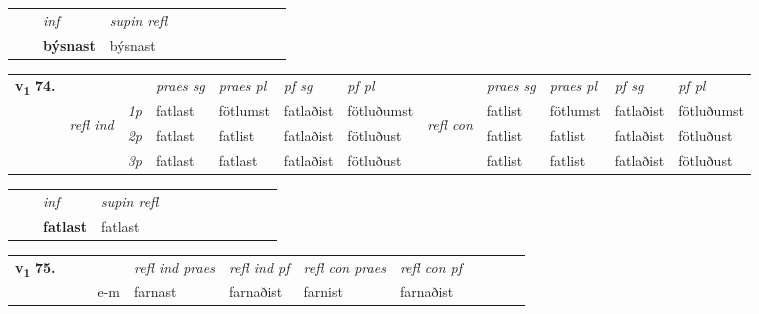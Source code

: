 \begin{tabular}{llllllllllll}
 & & \textit{inf}       & \textit{supin refl}      \\*
  & & \textbf{býsnast}        & býsnast  \\*
\cmidrule{1-12}
\end{tabular}



\begin{tabular}{llllllllllll} \toprule
\multirow{4}{*}{{{\textbf{v{\textsubscript{1}}} \Large{\textbf{74.}}}}}  & &   &  \textit{praes sg}  & \textit{praes pl}  &\textit{pf sg} & \textit{pf pl} &  &  \textit{praes sg}  & \textit{praes pl}  & \textit{pf sg} & \textit{pf pl } \\*
	\cmidrule{4-7} \cmidrule{9-12}
 &\multirow{3}{*}{\begin{turn}{90}\textit{refl ind}\end{turn}} & {\textit{1p}} & fatlast & fötlumst    & fatlaðist & fötluðumst & \multirow{3}{*}{\begin{turn}{90}\textit{refl con}\end{turn}}  &fatlist & fötlumst & fatlaðist & fötluðumst\\*
 &&  {\textit{2p}} &  fatlast  & fatlist   & fatlaðist & fötluðust & &fatlist & fatlist & fatlaðist & fötluðust \\*
& &  {\textit{3p}} & fatlast & fatlast   & fatlaðist & fötluðust & & fatlist & fatlist& fatlaðist & fötluðust  \\*
\cmidrule{4-7} \cmidrule{9-12}
\end{tabular}


\begin{tabular}{llllllllllll}
 & & \textit{inf}       & \textit{supin refl}      \\*
  & & \textbf{fatlast}        & fatlast  \\*
\cmidrule{1-12}
\end{tabular}





\begin{tabular}{llllllllllll}\toprule
\multirow{4}{*}{{{\textbf{v{\textsubscript{1}}} \Large{\textbf{75.}}}}}  & &  & &  \textit{refl ind praes} & \textit{refl ind pf} & \textit{refl con praes} & \textit{refl con pf} \\*
&  & & e-m & farnast & farnaðist & farnist & farnaðist \\*
\cmidrule{5-9}
\end{tabular}


